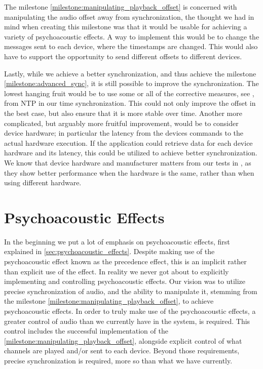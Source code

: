 The milestone \ref{milestone:manipulating_playback_offset} is concerned with manipulating the audio offset away from synchronization, the thought we had in mind when creating this milestone was that it would be usable for achieving a variety of psychoacoustic effects.
A way to implement this would be to change the  messages sent to each device, where the timestamps are changed.
This would also have to support the opportunity to send different offsets to different devices.

Lastly, while we achieve a better synchronization, and thus achieve the milestone \ref{milestone:advanced_sync}, it is still possible to improve the synchronization.
The lowest hanging fruit would be to use some or all of the corrective measures, see , from \ac{NTP} in our time synchronization.
This could not only improve the offset in the best case, but also ensure that it is more stable over time.
Another more complicated, but arguably more fruitful improvement, would be to consider device hardware; in particular the latency from the devices commands to the actual hardware execution.
If the application could retrieve data for each device hardware and its latency, this could be utilized to achieve better synchronization.
We know that device hardware and manufacturer matters from our tests in \cnameref{}, as they show better performance when the hardware is the same, rather than when using different hardware.

\section{Psychoacoustic Effects}
In the beginning we put a lot of emphasis on psychoacoustic effects, first explained in \cref{sec:psychoacoustic_effects}.
Despite making use of the psychoacoustic effect known as the precedence effect, this is an implicit rather than explicit use of the effect.
In reality we never got about to explicitly implementing and controlling psychoacoustic effects.
Our vision was to utilize precise synchronization of audio, and the ability to manipulate it, stemming from the milestone \ref{milestone:manipulating_playback_offset}, to achieve psychoacoustic effects.
In order to truly make use of the psychoacoustic effects, a greater control of audio than we currently have in the system, is required.
This control includes the successful implementation of the \ref{milestone:manipulating_playback_offset}, alongside explicit control of what channels are played and/or sent to each device.
Beyond those requirements, precise synchronization is required, more so than what we have currently.


